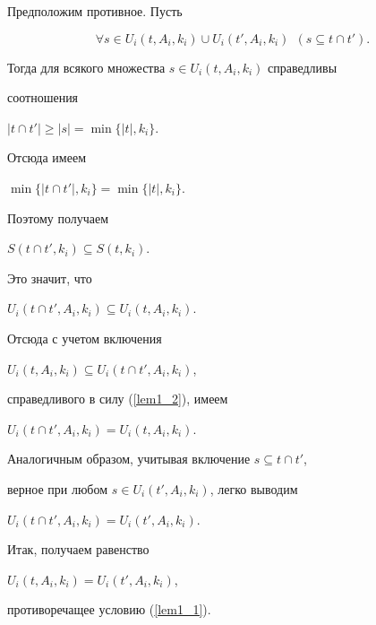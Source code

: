 \begin{pf}


Предположим противное. Пусть


\begin{equation}\label{lem1_2}


\forall s\in U_i(t, A_i, k_i)\cup U_i(t', A_i, k_i) \ \


(s\subseteq t \cap t').


\end{equation}





Тогда для всякого множества $s\in U_i(t, A_i, k_i)$ справедливы


соотношения


$|t \cap t'| \geq |s|=\min\{|t|, k_i \}$.


Отсюда имеем


$\min\{|t \cap t'|, k_i \}=\min\{|t|, k_i \}$.


Поэтому получаем


$S(t \cap t', k_i)\subseteq S(t, k_i)$.


Это значит, что


$U_i(t \cap t', A_i, k_i)\subseteq U_i(t, A_i, k_i)$.


Отсюда с учетом включения


$U_i(t, A_i, k_i)\subseteq U_i(t\cap t', A_i, k_i)$,


справедливого в силу (\ref{lem1_2}), имеем


$U_i(t\cap t', A_i, k_i)=U_i(t, A_i, k_i)$.








Аналогичным образом, учитывая включение $s\subseteq t\cap t'$,


верное при любом $s \in U_i(t', A_i,k_i)$, легко выводим


$U_i(t \cap t', A_i, k_i)=U_i(t', A_i, k_i)$.


Итак, получаем равенство


$U_i(t, A_i, k_i) = U_i(t', A_i, k_i)$,


противоречащее условию (\ref{lem1_1}).


\end{pf}





